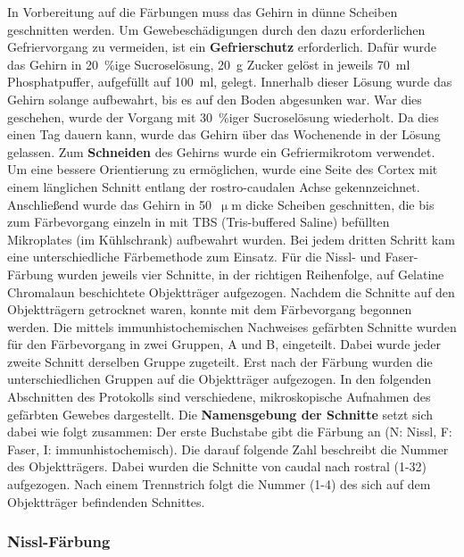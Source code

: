 \documentclass[12pt,a4paper,pdftex]{article}
\begin{document}
In Vorbereitung auf die Färbungen muss das Gehirn in dünne Scheiben geschnitten werden. Um Gewebeschädigungen durch den dazu erforderlichen Gefriervorgang zu vermeiden, ist ein \textbf{Gefrierschutz} erforderlich. Dafür wurde das Gehirn in 20~\%ige Sucroselösung, 20~g Zucker gelöst in jeweils 70~ml Phosphatpuffer, aufgefüllt auf 100~ml, gelegt. Innerhalb dieser Lösung wurde das Gehirn solange aufbewahrt, bis es auf den Boden abgesunken war. War dies geschehen, wurde der Vorgang mit 30~\%iger Sucroselösung wiederholt. Da dies einen Tag dauern kann, wurde das Gehirn über das Wochenende in der Lösung gelassen. Zum \textbf{Schneiden} des Gehirns wurde ein Gefriermikrotom verwendet. Um eine bessere Orientierung zu ermöglichen, wurde eine Seite des Cortex mit einem länglichen Schnitt entlang der rostro-caudalen Achse gekennzeichnet. Anschließend wurde das Gehirn in 50~$\upmu$m dicke Scheiben geschnitten, die bis zum Färbevorgang einzeln in mit TBS (Tris-buffered Saline) befüllten Mikroplates (im Kühlschrank) aufbewahrt wurden. Bei jedem dritten Schritt kam eine unterschiedliche Färbemethode zum Einsatz. Für die Nissl- und Faser-Färbung wurden jeweils vier Schnitte, in der richtigen Reihenfolge, auf Gelatine Chromalaun beschichtete Objektträger aufgezogen. Nachdem die Schnitte auf den Objektträgern getrocknet waren, konnte mit dem Färbevorgang begonnen werden. Die mittels immunhistochemischen Nachweises gefärbten Schnitte wurden für den Färbevorgang in zwei Gruppen, A und B, eingeteilt. Dabei wurde jeder zweite Schnitt derselben Gruppe zugeteilt. Erst nach der Färbung wurden die unterschiedlichen Gruppen auf die Objektträger aufgezogen. In den folgenden Abschnitten des Protokolls sind verschiedene, mikroskopische Aufnahmen des gefärbten Gewebes dargestellt. Die \textbf{Namensgebung der Schnitte} setzt sich dabei wie folgt zusammen: Der erste Buchstabe gibt die Färbung an (N: Nissl, F: Faser, I: immunhistochemisch). Die darauf folgende Zahl beschreibt die Nummer des Objektträgers. Dabei wurden die Schnitte von caudal nach rostral (1-32) aufgezogen. Nach einem Trennstrich folgt die Nummer (1-4) des sich auf dem Objektträger befindenden Schnittes.

\subsubsection{Nissl-Färbung}
\end{document}
